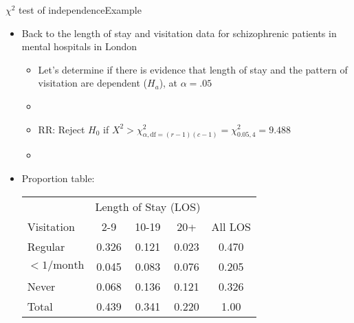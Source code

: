 \documentclass[xcolor=dvipsnames]{beamer}
\begin{document}
\begin{frame}{$\chi^2$ test of independence}{Example}
	\begin{itemize}
		\item Back to the length of stay and visitation data for schizophrenic patients in mental hospitals in London
		\begin{itemize}
			\item Let's determine if there is evidence that length of stay and the pattern of visitation are dependent ($H_a$), at $\alpha = .05$
			\item[]
			\item RR: Reject $H_0$ if $X^2 > \chi^2_{\alpha,\text{df}=(r-1)(c-1)}=\chi^2_{0.05,4}= 9.488$
			\item[]
		\end{itemize}
		\item Proportion table:
		\begin{center}
			\begin{tabular}{|l|ccc|c|}
				\hline
				& \multicolumn{3}{c|}{Length of Stay (LOS)} & \\
				Visitation & 2-9 & 10-19 & 20+ & All LOS \\ \hline
				Regular & 0.326 & 0.121 & 0.023 & 0.470\\ 
				$<1/\text{month}$ & 0.045 & 0.083 & 0.076 & 0.205 \\
				Never & 0.068 & 0.136 & 0.121 & 0.326\\ \hline
				Total & 0.439 & 0.341 & 0.220 & 1.00\\ \hline
			\end{tabular}
		\end{center}
	\end{itemize}
\end{frame}
\end{document}
